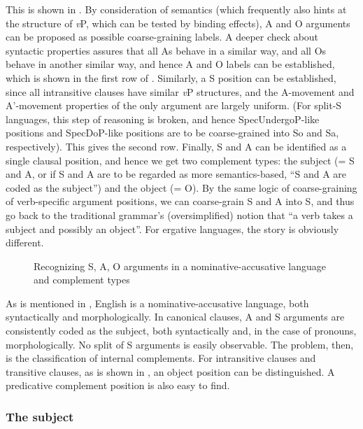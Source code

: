 \documentclass{article}
\newcommand*{\vP}{\textit{v}P}
\begin{document}
This is shown in .
By consideration of semantics 
(which frequently also hints at the structure of \vP,
which can be tested by binding effects),
A and O arguments can be proposed as possible coarse-graining labels.
A deeper check about syntactic properties assures 
that all As behave in a similar way, 
and all Os behave in another similar way,
and hence A and O labels can be established, 
which is shown in the first row of .
Similarly, a S position can be established,
since all intransitive clauses have similar \vP{} structures, 
and the A-movement and A'-movement properties of the only argument are largely uniform.
(For split-S languages, this step of reasoning is broken,
and hence SpecUndergoP-like positions and SpecDoP-like positions 
are to be coarse-grained into So and Sa, respectively).
This gives the second row.
Finally, S and A can be identified as a single clausal position,
and hence we get two complement types: the subject 
(= S and A, or if S and A are to be regarded as more semantics-based, 
``S and A are coded as the subject'') 
and the object (= O).
By the same logic of coarse-graining of verb-specific argument positions,
we can coarse-grain S and A into S, 
and thus go back to the traditional grammar's (oversimplified) notion that 
``a verb takes a subject and possibly an object''.
For ergative languages, the story is obviously different.

\begin{figure}
    \centering
    
    \caption{Recognizing S, A, O arguments in a nominative-accusative language and complement types}
    \label{fig:sao-acc}
\end{figure}

As is mentioned in ,
English is a nominative-accusative language,
both syntactically and morphologically.
In canonical clauses,
A and S arguments are consistently coded as the subject, both syntactically and, 
in the case of pronouns, morphologically.
No split of S arguments is easily observable. %
The problem, then, is the classification of internal complements.
For intransitive clauses and transitive clauses,
as is shown in ,
an object position can be distinguished.
A predicative complement position is also easy to find. %

\subsubsection{The subject} \label{sec:subject}
\end{document}
